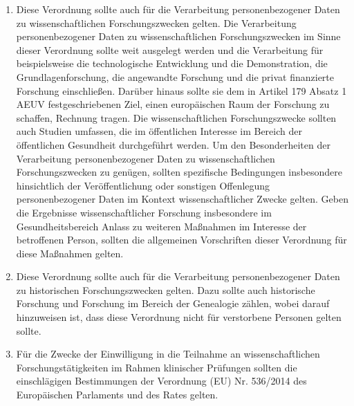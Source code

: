\begin{enumerate}

   \item Diese Verordnung sollte auch für die Verarbeitung personenbezogener Daten zu wissenschaftlichen
    Forschungszwecken gelten. Die Verarbeitung personenbezogener Daten zu wissenschaftlichen Forschungszwecken im Sinne
    dieser Verordnung sollte weit ausgelegt werden und die Verarbeitung für beispielsweise die technologische
    Entwicklung und die Demonstration, die Grundlagenforschung, die angewandte Forschung und die privat finanzierte
    Forschung einschließen. Darüber hinaus sollte sie dem in Artikel 179 Absatz 1 AEUV festgeschriebenen Ziel, einen
    europäischen Raum der Forschung zu schaffen, Rechnung tragen. Die wissenschaftlichen Forschungszwecke sollten auch
    Studien umfassen, die im öffentlichen Interesse im Bereich der öffentlichen Gesundheit durchgeführt werden. Um den
    Besonderheiten der Verarbeitung personenbezogener Daten zu wissenschaftlichen Forschungszwecken zu genügen, sollten
    spezifische Bedingungen insbesondere hinsichtlich der Veröffentlichung oder sonstigen Offenlegung personenbezogener
    Daten im Kontext wissenschaftlicher Zwecke gelten. Geben die Ergebnisse wissenschaftlicher Forschung insbesondere
    im Gesundheitsbereich Anlass zu weiteren Maßnahmen im Interesse der betroffenen Person, sollten die allgemeinen
    Vorschriften dieser Verordnung für diese Maßnahmen gelten.%
   \label{eg:159}
   

   \item Diese Verordnung sollte auch für die Verarbeitung personenbezogener Daten zu historischen Forschungszwecken
    gelten. Dazu sollte auch historische Forschung und Forschung im Bereich der Genealogie zählen, wobei darauf
    hinzuweisen ist, dass diese Verordnung nicht für verstorbene Personen gelten sollte.%
   \label{eg:160}
   

   \item Für die Zwecke der Einwilligung in die Teilnahme an wissenschaftlichen Forschungstätigkeiten im Rahmen
    klinischer Prüfungen sollten die einschlägigen Bestimmungen der Verordnung (EU) Nr. 536/2014 des Europäischen
    Parlaments und des Rates gelten.%
   \label{eg:161}
   

\end{enumerate}

